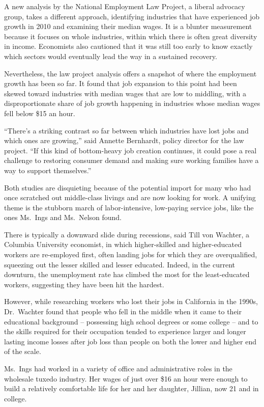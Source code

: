 ﻿\documentclass[12pt]{article}
\begin{document}
A new analysis by the National Employment Law Project, a liberal advocacy group, takes a different
approach, identifying industries that have experienced job growth in 2010 and examining their median
wages. It is a blunter measurement because it focuses on whole industries, within which there is
often great diversity in income. Economists also cautioned that it was still too early to know
exactly which sectors would eventually lead the way in a sustained recovery.

Nevertheless, the law project analysis offers a snapshot of where the employment growth has been so
far. It found that job expansion to this point had been skewed toward industries with median wages
that are low to middling, with a disproportionate share of job growth happening in industries whose
median wages fell below \$15 an hour.

``There's a striking contrast so far between which industries have lost jobs and which ones are
growing,'' said Annette Bernhardt, policy director for the law project. ``If this kind of
bottom-heavy job creation continues, it could pose a real challenge to restoring consumer demand and
making sure working families have a way to support themselves.''

Both studies are disquieting because of the potential import for many who had once scratched out
middle-class livings and are now looking for work. A unifying theme is the stubborn march of
labor-intensive, low-paying service jobs, like the ones Ms.~Ings and Ms.~Nelson found.

There is typically a downward slide during recessions, said Till von Wachter, a Columbia University
economist, in which higher-skilled and higher-educated workers are re-employed first, often landing
jobs for which they are overqualified, squeezing out the lesser skilled and lesser educated. Indeed,
in the current downturn, the unemployment rate has climbed the most for the least-educated workers,
suggesting they have been hit the hardest.

However, while researching workers who lost their jobs in California in the 1990s, Dr.~Wachter found
that people who fell in the middle when it came to their educational background -- possessing high
school degrees or some college -- and to the skills required for their occupation tended to
experience larger and longer lasting income losses after job loss than people on both the lower and
higher end of the scale.

Ms.~Ings had worked in a variety of office and administrative roles in the wholesale tuxedo
industry. Her wages of just over \$16 an hour were enough to build a relatively comfortable life for
her and her daughter, Jillian, now 21 and in college.
\end{document}
